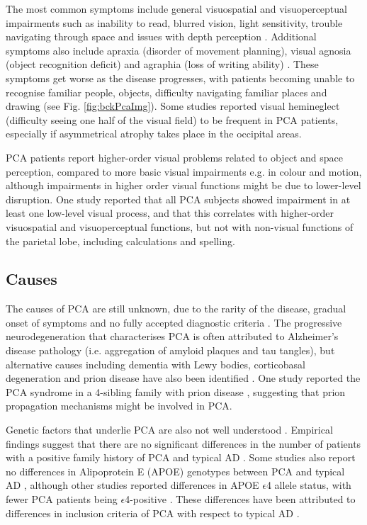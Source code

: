 The most common symptoms include general visuospatial and visuoperceptual impairments such as inability to read, blurred vision, light sensitivity, trouble navigating through space and issues with depth perception \cite{crutch2012posterior,borruat2013posterior}. Additional symptoms also include apraxia (disorder of movement planning), visual agnosia (object recognition deficit) and agraphia (loss of writing ability) \cite{benson1988posterior, goethals2001posterior}. These symptoms get worse as the disease progresses, with patients becoming unable to recognise familiar people, objects, difficulty navigating familiar places and drawing (see Fig. \ref{fig:bckPcaImg}). Some studies  \cite{andrade2010visual, andrade2012visuospatial, andrade2013visuospatial} reported visual hemineglect (difficulty seeing one half of the visual field) to be frequent in PCA patients, especially if asymmetrical atrophy takes place in the occipital areas. 

PCA patients report higher-order visual problems related to object and space perception, compared to more basic visual impairments e.g. in colour and motion, although impairments in higher order visual functions might be due to lower-level disruption. One study \cite{lehmann2011basic} reported that all PCA subjects showed impairment in at least one low-level visual process, and that this correlates with higher-order visuospatial and visuoperceptual functions, but not with non-visual functions of the parietal lobe, including calculations and spelling.

\subsection{Causes}
\label{sec:bckPcaCau}

The causes of PCA are still unknown, due to the rarity of the disease, gradual onset of symptoms and no fully accepted diagnostic criteria \cite{borruat2013posterior,crutch2012posterior}. The progressive neurodegeneration that characterises PCA is often attributed to Alzheimer's disease pathology (i.e. aggregation of amyloid plaques and tau tangles), but alternative causes including dementia with Lewy bodies, corticobasal degeneration and prion disease have also been identified \cite{crutch2012posterior}. One study reported the PCA syndrome in a 4-sibling family with prion disease \cite{depaz2012long}, suggesting that prion propagation mechanisms might be involved in PCA.

Genetic factors that underlie PCA are also not well understood \cite{crutch2012posterior,borruat2013posterior}. Empirical findings suggest that there are no significant differences in the number of patients with a positive family history of PCA and typical AD \cite{crutch2012posterior}. Some studies also report no differences in Alipoprotein E (APOE) genotypes between PCA and typical AD \cite{mendez2002posterior, tang2004clinical, rosenbloom2011distinct, migliaccio2009clinical}, although other studies reported differences in APOE $\epsilon$4 allele status, with fewer PCA patients being $\epsilon$4-positive \cite{schott2006apolipoprotein,snowden2007cognitive}. These differences have been attributed to differences in inclusion criteria of PCA with respect to typical AD \cite{crutch2012posterior}.

